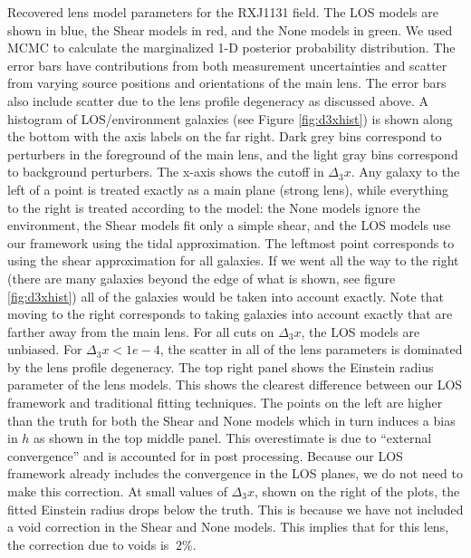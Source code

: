 \label{fig:RXJ1131} Recovered lens model parameters for the RXJ1131 field. The LOS models are shown in blue, the Shear models in red, and the None models in green. We used MCMC to calculate the marginalized 1-D posterior probability distribution. The error bars have contributions from both measurement uncertainties and scatter from varying source positions and orientations of the main lens. The error bars also include scatter due to the lens profile degeneracy as discussed above. A histogram of LOS/environment galaxies (see Figure \ref{fig:d3xhist}) is shown along the bottom with the axis labels on the far right. Dark grey bins correspond to perturbers in the foreground of the main lens, and the light gray bins correspond to background perturbers. The x-axis shows the cutoff in $\Delta_3 x$. Any galaxy to the left of a point is treated exactly as a main plane (strong lens), while everything to the right is treated according to the model: the None models ignore the environment, the Shear models fit only a simple shear, and the LOS models use our framework using the tidal approximation. The leftmost point corresponds to using the shear approximation for all galaxies. If we went all the way to the right (there are many galaxies beyond the edge of what is shown, see figure \ref{fig:d3xhist}) all of the galaxies would be taken into account exactly. Note that moving to the right corresponds to taking galaxies into account exactly that are farther away from the main lens. For all cuts on $\Delta_3 x$, the LOS models are unbiased. For $\Delta_3 x < 1e-4$, the scatter in all of the lens parameters is dominated by the lens profile degeneracy. The top right panel shows the Einstein radius parameter of the lens models. This shows the clearest difference between our LOS framework and traditional fitting techniques. The points on the left are higher than the truth for both the Shear and None models which in turn induces a bias in $h$ as shown in the top middle panel. This overestimate is due to ``external convergence'' and is accounted for in post processing. Because our LOS framework already includes the convergence in the LOS planes, we do not need to make this correction. At small values of $\Delta_3 x$, shown on the right of the plots, the fitted Einstein radius drops below the truth. This is because we have not included a void correction in the Shear and None models. This implies that for this lens, the correction due to voids is $~2\%$.